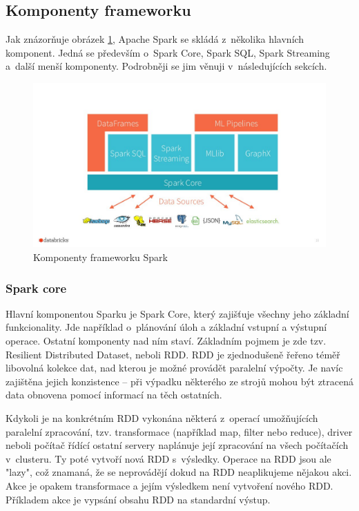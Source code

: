 \documentclass[thesis=B,czech]{FITthesis}[2012/06/26]
\begin{document}
\subsection{Komponenty frameworku}
	Jak znázorňuje obrázek \ref{fig:spark_components}, Apache Spark se skládá z~několika hlavních komponent. Jedná se především o~Spark Core, Spark SQL, Spark Streaming a~další menší komponenty. Podrobněji se jim věnuji v~následujících sekcích. 
	\begin{figure}[ht]
    	\centering
    	\includegraphics[width=1\textwidth]{images/spark_engine.jpg}
    	\caption{Komponenty frameworku Spark\cite{spark-components}}
    	\label{fig:spark_components}
	\end{figure}
	
\subsubsection{Spark core}
\label{spark-core}
	Hlavní komponentou Sparku je Spark Core, který zajišťuje všechny jeho základní funkcionality. Jde například o~plánování úloh a základní vstupní a výstupní operace. Ostatní komponenty nad ním staví. Základním pojmem je zde tzv. Resilient Distributed Dataset, neboli RDD. RDD je zjednodušeně řeřeno téměř libovolná kolekce dat, nad kterou je možné provádět paralelní výpočty. Je navíc zajištěna jejich konzistence -- při výpadku některého ze strojů mohou být ztracená data obnovena pomocí informací na těch ostatních. 
	
	Kdykoli je na konkrétním RDD vykonána některá z~operací umožňujících paralelní zpracování, tzv. transformace (například map, filter nebo reduce), driver neboli počítač řídící ostatní servery naplánuje její zpracování na všech počítačích v~clusteru. Ty poté vytvoří nová RDD s~výsledky. Operace na RDD jsou ale "lazy", což znamaná, že se neprovádějí dokud na RDD neaplikujeme nějakou akci. Akce je opakem transformace a jejím výsledkem není vytvoření nového RDD. Příkladem akce je vypsání obsahu RDD na standardní výstup. 
\end{document}
